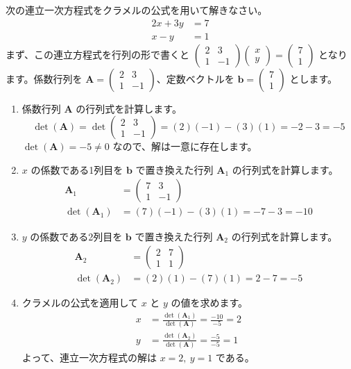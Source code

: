 \begin{ex}
次の連立一次方程式をクラメルの公式を用いて解きなさい。
\begin{align*} 2x + 3y &= 7 \\ x - y &= 1 \end{align*}
まず、この連立方程式を行列の形で書くと $\begin{pmatrix} 2 & 3 \\ 1 & -1 \end{pmatrix} \begin{pmatrix} x \\ y \end{pmatrix} = \begin{pmatrix} 7 \\ 1 \end{pmatrix}$ となります。係数行列を $\bm{A} = \begin{pmatrix} 2 & 3 \\ 1 & -1 \end{pmatrix}$、定数ベクトルを $\bm{b} = \begin{pmatrix} 7 \\ 1 \end{pmatrix}$ とします。
\begin{enumerate}
\item 係数行列 $\bm{A}$ の行列式を計算します。
\[ \det(\bm{A}) = \det\begin{pmatrix} 2 & 3 \\ 1 & -1 \end{pmatrix} = (2)(-1) - (3)(1) = -2 - 3 = -5 \]
$\det(\bm{A}) = -5 \neq 0$ なので、解は一意に存在します。
\item $x$ の係数である1列目を $\bm{b}$ で置き換えた行列 $\bm{A}_1$ の行列式を計算します。
\begin{align*}
\bm{A}_1 &= \begin{pmatrix} 7 & 3 \\ 1 & -1 \end{pmatrix} \\
\det(\bm{A}_1) &= (7)(-1) - (3)(1) = -7 - 3 = -10
\end{align*}
\item $y$ の係数である2列目を $\bm{b}$ で置き換えた行列 $\bm{A}_2$ の行列式を計算します。
\begin{align*}
\bm{A}_2 &= \begin{pmatrix} 2 & 7 \\ 1 & 1 \end{pmatrix} \\
\det(\bm{A}_2) &= (2)(1) - (7)(1) = 2 - 7 = -5
\end{align*}
\item クラメルの公式を適用して $x$ と $y$ の値を求めます。
\begin{align*}
x &= \frac{\det(\bm{A}_1)}{\det(\bm{A})} = \frac{-10}{-5} = 2 \\
y &= \frac{\det(\bm{A}_2)}{\det(\bm{A})} = \frac{-5}{-5} = 1
\end{align*}
よって、連立一次方程式の解は $x=2,\ y=1$ である。
\end{enumerate}
\end{ex}

